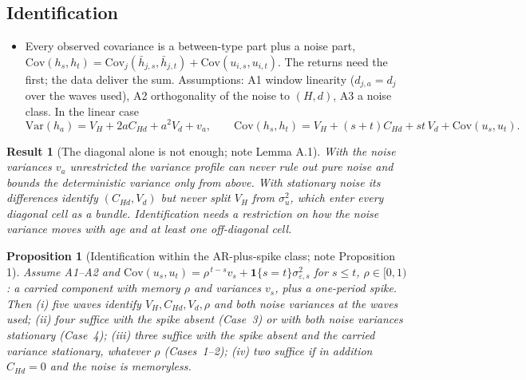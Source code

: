 \documentclass[11pt]{article}
\newtheorem{proposition}{Proposition}
\newtheorem{result}{Result}
\newcommand{\Var}{\mathrm{Var}}
\newcommand{\Cov}{\mathrm{Cov}}
\begin{document}
\subsection{Identification}
\label{sec:ident_fw}

\begin{itemize}
\item Every observed covariance is a between-type part plus a noise part, $\Cov(h_s,h_t)=\Cov_j(\bar h_{j,s},\bar h_{j,t})+\Cov(u_{i,s},u_{i,t})$. The returns need the first; the data deliver the sum. Assumptions: A1 window linearity ($d_{j,a}=d_j$ over the waves used), A2 orthogonality of the noise to $(H,d)$, A3 a noise class. In the linear case
\begin{equation}
\Var(h_a)=V_H+2aC_{Hd}+a^2V_d+v_a,\qquad
\Cov(h_s,h_t)=V_H+(s+t)C_{Hd}+st\,V_d+\Cov(u_s,u_t).
\label{eq:forward}
\end{equation}
\end{itemize}

\begin{result}[The diagonal alone is not enough; note Lemma A.1]\label{lem:diag}
With the noise variances $v_a$ unrestricted the variance profile can never rule out pure noise and bounds the deterministic variance only from above. With stationary noise its differences identify $(C_{Hd},V_d)$ but never split $V_H$ from $\sigma^2_u$, which enter every diagonal cell as a bundle. Identification needs a restriction on how the noise variance moves with age and at least one off-diagonal cell.
\end{result}

\begin{proposition}[Identification within the AR-plus-spike class; note Proposition 1]\label{prop:main}
Assume A1--A2 and $\Cov(u_s,u_t)=\rho^{\,t-s}v_s+\mathbf 1\{s=t\}\sigma^2_{\varepsilon,s}$ for $s\le t$, $\rho\in[0,1)$: a carried component with memory $\rho$ and variances $v_s$, plus a one-period spike. Then (i) five waves identify $V_H,C_{Hd},V_d,\rho$ and both noise variances at the waves used; (ii) four suffice with the spike absent (Case~3) or with both noise variances stationary (Case~4); (iii) three suffice with the spike absent and the carried variance stationary, whatever $\rho$ (Cases~1--2); (iv) two suffice if in addition $C_{Hd}=0$ and the noise is memoryless.
\end{proposition}
\end{document}
